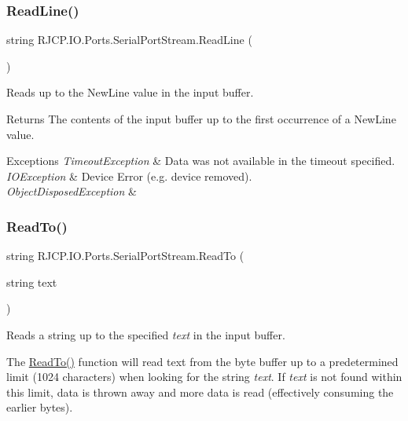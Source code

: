 \subsubsection{\texorpdfstring{ReadLine()}{ReadLine()}}
{\footnotesize\ttfamily string R\+J\+C\+P.\+I\+O.\+Ports.\+Serial\+Port\+Stream.\+Read\+Line (\begin{DoxyParamCaption}{ }\end{DoxyParamCaption})}



Reads up to the New\+Line value in the input buffer. 

\begin{DoxyReturn}{Returns}
The contents of the input buffer up to the first occurrence of a New\+Line value.
\end{DoxyReturn}

\begin{DoxyExceptions}{Exceptions}
{\em Timeout\+Exception} & Data was not available in the timeout specified.\\
\hline
{\em I\+O\+Exception} & Device Error (e.\+g. device removed).\\
\hline
{\em Object\+Disposed\+Exception} & \\
\hline
\end{DoxyExceptions}
\mbox{\label{class_r_j_c_p_1_1_i_o_1_1_ports_1_1_serial_port_stream_a083926914c8855489f5bdcbd0bc3a78c}} 
\subsubsection{\texorpdfstring{ReadTo()}{ReadTo()}}
{\footnotesize\ttfamily string R\+J\+C\+P.\+I\+O.\+Ports.\+Serial\+Port\+Stream.\+Read\+To (\begin{DoxyParamCaption}\item[{string}]{text }\end{DoxyParamCaption})}



Reads a string up to the specified {\itshape text} in the input buffer. 

The \mbox{\hyperlink{class_r_j_c_p_1_1_i_o_1_1_ports_1_1_serial_port_stream_a083926914c8855489f5bdcbd0bc3a78c}{Read\+To()}} function will read text from the byte buffer up to a predetermined limit (1024 characters) when looking for the string {\itshape text}. If {\itshape text} is not found within this limit, data is thrown away and more data is read (effectively consuming the earlier bytes). 

